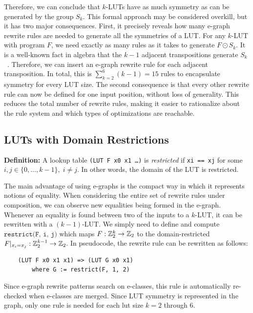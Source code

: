 Therefore, we can conclude that $k$-LUTs have as much symmetry as can be
generated by the group $S_k$. This formal approach may be considered overkill,
but it has two major consequences. First, it precisely reveals how many e-graph
rewrite rules are needed to generate all the symmetries of a LUT. For any
$k$-LUT with program $F$, we need exactly as many rules as it takes to generate
$F \odot S_k$. It is a well-known fact in algebra that the $k-1$ adjacent
transpositions generate $S_k$~\cite{sgroup}. Therefore, we can insert an
e-graph rewrite rule for each adjacent transposition. In total, this is
$\sum_{k=2}^{6} (k-1) = 15$ rules to encapsulate symmetry for every LUT size.
The second consequence is that every other rewrite rule can now be defined for
one input position, without loss of generality. This reduces the total number
of rewrite rules, making it easier to rationalize about the rule system and
which types of optimizations are reachable.

\subsection{LUTs with Domain Restrictions}\label{sec:rewrites:restrict}

\textbf{Definition:} A lookup table \texttt{(LUT F x0 x1 \ldots)} is \textit{restricted} if \texttt{xi == xj} for some $ i, j \in \{0, \ldots, k-1\}, \; i \neq j$.
In other words, the domain of the LUT is restricted.

The main advantage of using e-graphs is the compact way in which it represents
notions of equality. When considering the entire set of rewrite rules under
composition, we can observe new equalities being formed in the e-graph.
Whenever an equality is found between two of the inputs to a $k$-LUT, it can be
rewritten with a $(k-1)$-LUT. We simply need to define and compute
$\texttt{restrict(F, i, j)}$ which maps $F : \mathbb{Z}_{2}^{k} \rightarrow \mathbb{Z}_{2}$ to the
domain-restricted $F \vert_{x_i = x_j} : \mathbb{Z}_{2}^{k-1} \rightarrow \mathbb{Z}_{2}$. In
pseudocode, the rewrite rule can be rewritten as follows:

\begin{verbatim}
    (LUT F x0 x1 x1) => (LUT G x0 x1)
        where G := restrict(F, 1, 2)
\end{verbatim}

Since e-graph rewrite patterns search on e-classes, this rule is automatically
re-checked when e-classes are merged. Since LUT symmetry is represented in the
graph, only one rule is needed for each lut size $k=2$ through 6.

